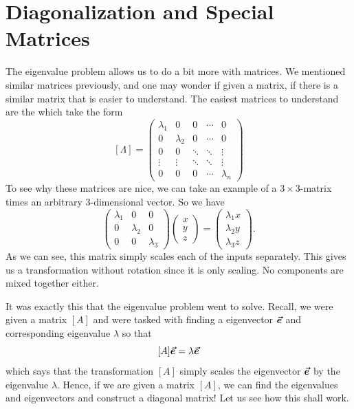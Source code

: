         \section{Diagonalization and Special Matrices}
            The eigenvalue problem allows us to do a bit more with matrices.  We mentioned similar matrices previously, and one may wonder if given a matrix, if there is a similar matrix that is easier to understand.  The easiest matrices to understand are the   which take the form
            \[
            [\Lambda] = \begin{pmatrix} \lambda_1 & 0 & 0 & \cdots & 0 \\
                                        0 & \lambda_2 & 0 & \cdots & 0 \\
                                        0 & 0 & \ddots & \ddots & \vdots \\
                                        \vdots & \vdots & \ddots & \ddots & \vdots \\
                                        0 & 0 & 0 & \cdots & \lambda_n \end{pmatrix}
            \]
            To see why these matrices are nice, we can take an example of a $3\times 3$-matrix times an arbitrary 3-dimensional vector. So we have
            \[
            \begin{pmatrix} \lambda_1 & 0 & 0 \\ 0 & \lambda_2 & 0 \\ 0 & 0 & \lambda_3 \end{pmatrix} \begin{pmatrix} x \\ y \\ z \end{pmatrix}= \begin{pmatrix} \lambda_1 x \\ \lambda_2 y \\ \lambda_3 z \end{pmatrix}.
            \]
            As we can see, this matrix simply scales each of the inputs separately.  This gives us a transformation without rotation since it is only scaling.  No components are mixed together either.  
            
            It was exactly this that the eigenvalue problem went to solve.  Recall, we were given a matrix $[A]$ and were tasked with finding a eigenvector $\boldsymbol{\vec{e}}$ and corresponding eigenvalue $\lambda$ so that
            \[
            [A]\boldsymbol{\vec{e}} = \lambda \boldsymbol{\vec{e}}
            \]
            which says that the transformation $[A]$ simply scales the eigenvector $\boldsymbol{\vec{e}}$ by the eigenvalue $\lambda$.  Hence, if we are given a matrix $[A]$, we can find the eigenvalues and eigenvectors and construct a diagonal matrix!  Let us see how this shall work. 
            
